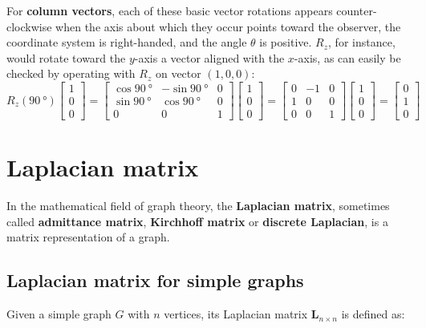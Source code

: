 For \textbf{column vectors}, each of these basic vector rotations appears counter-clockwise when the axis about which they occur points toward the observer, the coordinate system is right-handed, and the angle $ \theta $ is positive. $ R_z $, for instance, would rotate toward the $ y $-axis a vector aligned with the $ x $-axis, as can easily be checked by operating with $ R_z $ on vector $ (1, 0, 0) $:
\begin{equation}
R_z(\SI{90}{\degree})\begin{bmatrix}
1\\
0\\
0
\end{bmatrix} = \begin{bmatrix}
\cos \SI{90}{\degree} & -\sin \SI{90}{\degree} & 0\\
\sin \SI{90}{\degree} & \cos \SI{90}{\degree} & 0\\
0 & 0 & 1
\end{bmatrix} \begin{bmatrix}
1\\
0\\
0
\end{bmatrix} = \begin{bmatrix}
0 & -1 & 0\\
1 & 0 & 0\\
0 & 0 & 1
\end{bmatrix} \begin{bmatrix}
1\\
0\\
0
\end{bmatrix} = \begin{bmatrix}
0\\
1\\
0
\end{bmatrix} 
\end{equation}

\section{Laplacian matrix}
In the mathematical field of graph theory, the \textbf{Laplacian matrix}, 
sometimes called \textbf{admittance matrix}, \textbf{Kirchhoff matrix} or \textbf{discrete Laplacian}, 
is a matrix representation of a graph.

\subsection{Laplacian matrix for simple graphs}
Given a simple graph $ G $ with $ n $ vertices, its Laplacian matrix $ \mathbf{L}_{n \times n} $ is defined as:


